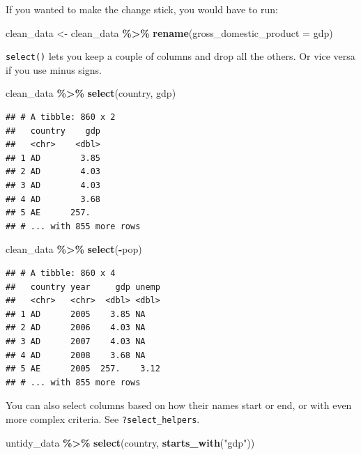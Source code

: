 \documentclass[
  12pt,
  oneside,openany]{book}
\newenvironment{Shaded}{\begin{snugshade}}{\end{snugshade}}
\newcommand{\DataTypeTok}[1]{\textcolor[rgb]{0.13,0.29,0.53}{#1}}
\newcommand{\KeywordTok}[1]{\textcolor[rgb]{0.13,0.29,0.53}{\textbf{#1}}}
\newcommand{\NormalTok}[1]{#1}
\newcommand{\OperatorTok}[1]{\textcolor[rgb]{0.81,0.36,0.00}{\textbf{#1}}}
\newcommand{\StringTok}[1]{\textcolor[rgb]{0.31,0.60,0.02}{#1}}
\begin{document}
If you wanted to make the change stick, you would have to run:

\begin{Shaded}
\begin{Highlighting}[]
\NormalTok{clean\_data \textless{}{-}}\StringTok{ }\NormalTok{clean\_data }\OperatorTok{\%\textgreater{}\%}
\StringTok{  }\KeywordTok{rename}\NormalTok{(}\DataTypeTok{gross\_domestic\_product =}\NormalTok{ gdp)}
\end{Highlighting}
\end{Shaded}

\texttt{select()} lets you keep a couple of columns and drop all the others. Or vice versa if you use minus signs.

\begin{Shaded}
\begin{Highlighting}[]
\NormalTok{clean\_data }\OperatorTok{\%\textgreater{}\%}
\StringTok{  }\KeywordTok{select}\NormalTok{(country, gdp)}
\end{Highlighting}
\end{Shaded}

\begin{verbatim}
## # A tibble: 860 x 2
##   country    gdp
##   <chr>    <dbl>
## 1 AD        3.85
## 2 AD        4.03
## 3 AD        4.03
## 4 AD        3.68
## 5 AE      257.  
## # ... with 855 more rows
\end{verbatim}

\begin{Shaded}
\begin{Highlighting}[]
\NormalTok{clean\_data }\OperatorTok{\%\textgreater{}\%}
\StringTok{  }\KeywordTok{select}\NormalTok{(}\OperatorTok{{-}}\NormalTok{pop)}
\end{Highlighting}
\end{Shaded}

\begin{verbatim}
## # A tibble: 860 x 4
##   country year     gdp unemp
##   <chr>   <chr>  <dbl> <dbl>
## 1 AD      2005    3.85 NA   
## 2 AD      2006    4.03 NA   
## 3 AD      2007    4.03 NA   
## 4 AD      2008    3.68 NA   
## 5 AE      2005  257.    3.12
## # ... with 855 more rows
\end{verbatim}

You can also select columns based on how their names start or end, or with even more complex criteria.
See \texttt{?select\_helpers}.

\begin{Shaded}
\begin{Highlighting}[]
\NormalTok{untidy\_data }\OperatorTok{\%\textgreater{}\%}
\StringTok{  }\KeywordTok{select}\NormalTok{(country, }\KeywordTok{starts\_with}\NormalTok{(}\StringTok{"gdp"}\NormalTok{))}
\end{Highlighting}
\end{Shaded}
\end{document}
